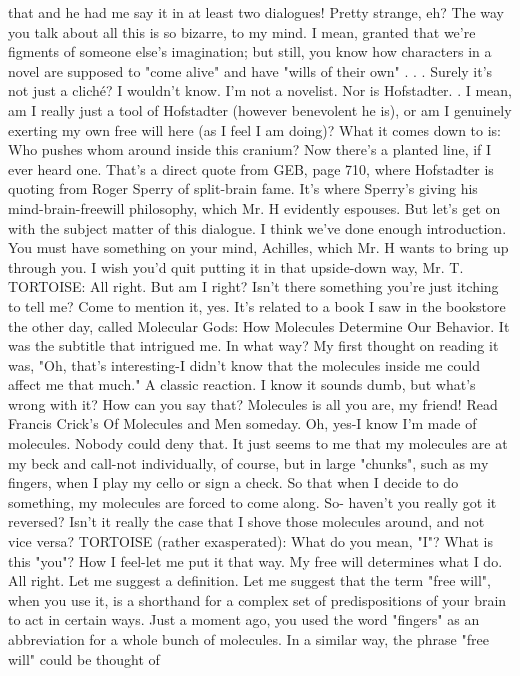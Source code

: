   that and he had me say it in at least two dialogues! Pretty strange, eh?
\achilles The way you talk about all this is so bizarre, to my mind. I mean,
  granted that we're figments of someone else's imagination; but still, you know how
  characters in a novel are supposed to "come alive" and have "wills of their own" . .
  . Surely it's not just a cliché?
\tortoise I wouldn't know. I'm not a novelist. Nor is Hofstadter. .
\achilles I mean, am I really just a tool of Hofstadter (however benevolent he is),
  or am I genuinely exerting my own free will here (as I feel I am doing)? What it
  comes down to is: Who pushes whom around inside this cranium?
\tortoise Now there's a planted line, if I ever heard one. That's a direct quote from
  GEB, page 710, where Hofstadter is quoting from Roger Sperry of split-brain
  fame. It's where Sperry's giving his mind-brain-freewill philosophy, which Mr. H
  evidently espouses. But let's get on with the subject matter of this dialogue. I think
  we've done enough introduction. You must have something on your mind,
  Achilles, which Mr. H wants to bring up through you.
\achilles I wish you'd quit putting it in that upside-down way, Mr. T. TORTOISE:
  All right. But am I right? Isn't there something you're just itching to tell me?
\achilles Come to mention it, yes. It's related to a book I saw in the bookstore the
  other day, called Molecular Gods: How Molecules Determine Our Behavior. It was
  the subtitle that intrigued me.
\tortoise In what way?
\achilles My first thought on reading it was, "Oh, that's interesting-I didn't know
  that the molecules inside me could affect me that much."
\tortoise A classic reaction.
\achilles I know it sounds dumb, but what's wrong with it?
\tortoise How can you say that? Molecules is all you are, my friend! Read Francis
  Crick's Of Molecules and Men someday.
\achilles Oh, yes-I know I'm made of molecules. Nobody could deny that. It just
  seems to me that my molecules are at my beck and call-not individually, of course,
  but in large "chunks", such as my fingers, when I play my cello or sign a check. So
  that when I decide to do something, my molecules are forced to come along. So-
  haven't you really got it reversed? Isn't it really the case that I shove those
  molecules around, and not vice versa?
TORTOISE (rather exasperated): What do you mean, "I"? What is this "you"?
\achilles How I feel-let me put it that way. My free will determines what I do.
\tortoise All right. Let me suggest a definition. Let me suggest that the term "free
  will", when you use it, is a shorthand for a complex set of predispositions of your
  brain to act in certain ways. Just a moment ago, you used the word "fingers" as an
  abbreviation for a whole bunch of molecules. In a similar way, the phrase "free
  will" could be thought of




